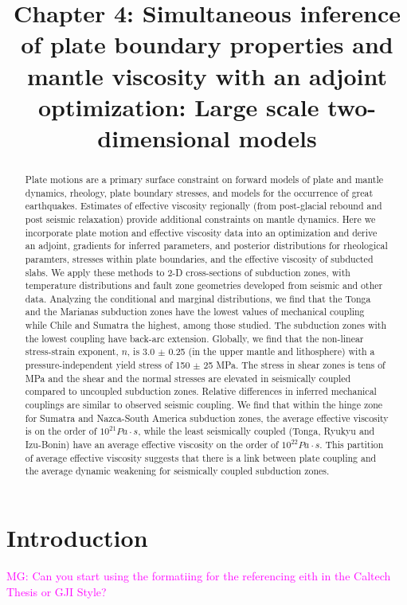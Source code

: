\documentclass[12pt]{article}
\date{}
\title{Chapter 4: Simultaneous inference of plate boundary properties and mantle viscosity with an adjoint optimization: Large scale two-dimensional models}
\newcommand{\mgnote}[1]{\textcolor{magenta}{MG: #1}}
\begin{document}
\maketitle
\begin{abstract}
 Plate motions are a primary surface constraint on forward models of plate and mantle dynamics, rheology, plate boundary stresses, and models for the occurrence of great earthquakes. Estimates of effective viscosity regionally (from post-glacial rebound and post seismic relaxation) provide additional constraints on mantle dynamics. 
Here we incorporate plate motion and effective viscosity data into an optimization and derive an adjoint, gradients for inferred parameters, and posterior distributions for  rheological paramters, stresses within plate boundaries, and the effective viscosity of subducted slabs. 
We apply these methods to 2-D cross-sections of subduction zones, with temperature distributions and fault zone geometries developed from seismic and other data. 
Analyzing the conditional and marginal distributions, we find that the 
Tonga and the Marianas subduction zones have the lowest values of mechanical coupling while Chile and Sumatra the highest, among those studied. The subduction zones with the lowest coupling have back-arc extension. Globally, we find that the non-linear stress-strain exponent, $n$, is 3.0 $\pm$ 0.25 (in the upper mantle and lithosphere) with a pressure-independent yield stress of 150 $\pm$ 25 MPa. The stress in shear zones is tens of MPa and the shear and the normal stresses are elevated in seismically coupled compared to uncoupled subduction zones. 
Relative differences in inferred mechanical couplings are similar to observed seismic coupling. 
We find that within the hinge zone for Sumatra and Nazca-South America subduction zones, the average effective viscosity is on the order of $10^{21} Pa\cdot s$, while the least seismically coupled (Tonga, Ryukyu and Izu-Bonin) have an average effective viscosity on the order of $10^{22} Pa\cdot s$. This partition of average effective viscosity suggests that there is a link between plate coupling and the average dynamic weakening for seismically coupled subduction zones.
\end{abstract} 


\section{Introduction}

\mgnote{Can you start using the formatiing for the referencing eith in the Caltech Thesis or GJI Style?}
\end{document}
